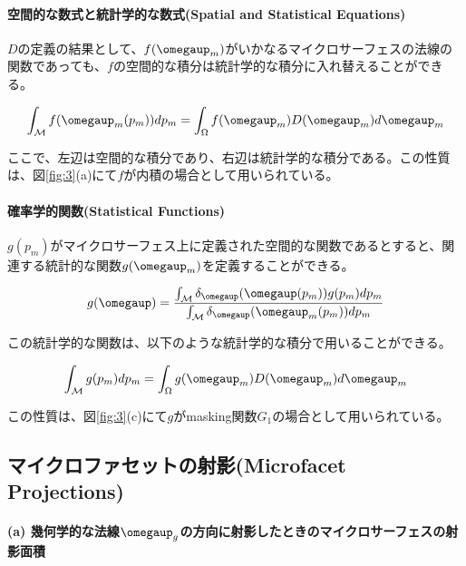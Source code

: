 \documentclass[a4paper,xelatex,ja=standard]{bxjsarticle}
\begin{document}
\paragraph{空間的な数式と統計学的な数式(Spatial and Statistical Equations)}

$D$の定義の結果として、$f(\boldsymbol{\omegaup}_m)$がいかなるマイクロサーフェスの法線の関数であっても、$f$の空間的な積分は統計学的な積分に入れ替えることができる。

\begin{equation}
    \int_{\mathcal M} f(\boldsymbol{\omegaup}_m(p_m))dp_m = \int_{\Omega}f(\boldsymbol{\omegaup}_m) D(\boldsymbol{\omegaup}_m)d\boldsymbol{\omegaup}_m
    \label{eq:6}
\end{equation}

ここで、左辺は空間的な積分であり、右辺は統計学的な積分である。この性質は、図\ref{fig:3}(a)にて$f$が内積の場合として用いられている。

\paragraph{確率学的関数(Statistical Functions)}

$g(p_m)$がマイクロサーフェス上に定義された空間的な関数であるとすると、関連する統計的な関数$g(\boldsymbol{\omegaup}_m)$を定義することができる。

\begin{equation}
    g(\boldsymbol{\omegaup}) = \frac{\int_{\mathcal M} \delta_{\boldsymbol{\omegaup}}(\boldsymbol{\omegaup}(p_m)) g(p_m) dp_m}{\int_{\mathcal M} \delta_{\boldsymbol{\omegaup}}(\boldsymbol{\omegaup}_m(p_m)) dp_m}
    \label{eq:7}
\end{equation}

この統計学的な関数は、以下のような統計学的な積分で用いることができる。

\begin{equation}
    \int_{\mathcal M} g(p_m)dp_m = \int_{\Omega}g(\boldsymbol{\omegaup}_m) D(\boldsymbol{\omegaup}_m)d\boldsymbol{\omegaup}_m
    \label{eq:8}
\end{equation}

この性質は、図\ref{fig:3}(c)にて$g$がmasking関数$G_1$の場合として用いられている。

\subsection{マイクロファセットの射影(Microfacet Projections)}

\paragraph{(a) 幾何学的な法線$\boldsymbol{\omegaup}_g$の方向に射影したときのマイクロサーフェスの射影面積}
\end{document}
